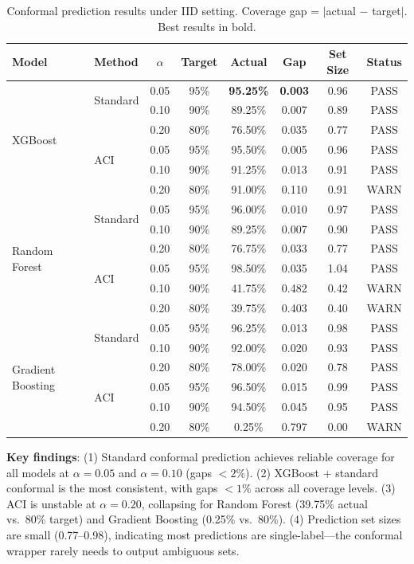 \documentclass{article}
\begin{document}
\begin{table}[t]
\centering
\caption{Conformal prediction results under IID setting. Coverage gap = $|$actual $-$ target$|$. Best results in bold.}
\label{tab:iid}
\small
\begin{tabular}{llcccccc}
\toprule
\textbf{Model} & \textbf{Method} & $\alpha$ & \textbf{Target} & \textbf{Actual} & \textbf{Gap} & \textbf{Set Size} & \textbf{Status} \\
\midrule
\multirow{6}{*}{XGBoost}
& \multirow{2}{*}{Standard} & 0.05 & 95\% & \textbf{95.25\%} & \textbf{0.003} & 0.96 & PASS \\
& & 0.10 & 90\% & 89.25\% & 0.007 & 0.89 & PASS \\
& & 0.20 & 80\% & 76.50\% & 0.035 & 0.77 & PASS \\
& \multirow{2}{*}{ACI} & 0.05 & 95\% & 95.50\% & 0.005 & 0.96 & PASS \\
& & 0.10 & 90\% & 91.25\% & 0.013 & 0.91 & PASS \\
& & 0.20 & 80\% & 91.00\% & 0.110 & 0.91 & WARN \\
\midrule
\multirow{6}{*}{Random Forest}
& \multirow{2}{*}{Standard} & 0.05 & 95\% & 96.00\% & 0.010 & 0.97 & PASS \\
& & 0.10 & 90\% & 89.25\% & 0.007 & 0.90 & PASS \\
& & 0.20 & 80\% & 76.75\% & 0.033 & 0.77 & PASS \\
& \multirow{2}{*}{ACI} & 0.05 & 95\% & 98.50\% & 0.035 & 1.04 & PASS \\
& & 0.10 & 90\% & 41.75\% & 0.482 & 0.42 & WARN \\
& & 0.20 & 80\% & 39.75\% & 0.403 & 0.40 & WARN \\
\midrule
\multirow{6}{*}{Gradient Boosting}
& \multirow{2}{*}{Standard} & 0.05 & 95\% & 96.25\% & 0.013 & 0.98 & PASS \\
& & 0.10 & 90\% & 92.00\% & 0.020 & 0.93 & PASS \\
& & 0.20 & 80\% & 78.00\% & 0.020 & 0.78 & PASS \\
& \multirow{2}{*}{ACI} & 0.05 & 95\% & 96.50\% & 0.015 & 0.99 & PASS \\
& & 0.10 & 90\% & 94.50\% & 0.045 & 0.95 & PASS \\
& & 0.20 & 80\% & 0.25\% & 0.797 & 0.00 & WARN \\
\bottomrule
\end{tabular}
\end{table}

\textbf{Key findings}: (1) Standard conformal prediction achieves reliable coverage for all models at $\alpha=0.05$ and $\alpha=0.10$ (gaps $< 2\%$). (2) XGBoost + standard conformal is the most consistent, with gaps $< 1\%$ across all coverage levels. (3) ACI is unstable at $\alpha=0.20$, collapsing for Random Forest (39.75\% actual vs.\ 80\% target) and Gradient Boosting (0.25\% vs.\ 80\%). (4) Prediction set sizes are small (0.77--0.98), indicating most predictions are single-label---the conformal wrapper rarely needs to output ambiguous sets.
\end{document}
